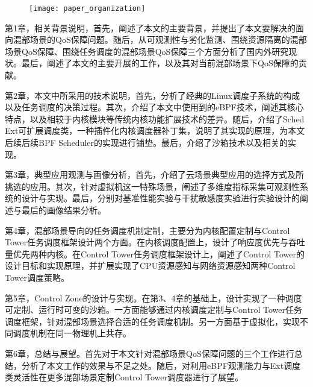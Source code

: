 \begin{figure}[!htbp]
    \centering
    \texttt{[image: paper\_organization]}
    \label{fig:paper_organization}
\end{figure}

第1章，相关背景说明，首先，阐述了本文的主要背景，并提出了本文要解决的面向混部场景的QoS保障问题。随后，从可观测性与劣化监测、围绕资源隔离的混部场景QoS保障、围绕任务调度的混部场景QoS保障三个方面分析了国内外研究现状。最后，阐述了本文的主要开展的工作，以及其对当前混部场景下QoS保障的贡献。

第2章，本文中所采用的技术说明，首先，分析了经典的Linux调度子系统的构成以及任务调度的决策过程。其次，介绍了本文中使用到的eBPF技术，阐述其核心特点，以及相较于内核模块等传统内核功能扩展技术的差异。随后，介绍了Sched Ext可扩展调度类，一种插件化内核调度器补丁集，说明了其实现的原理，为本文后续后续BPF Scheduler的实现进行铺垫。最后，介绍了沙箱技术以及相关的实现。

第3章，典型应用观测与画像分析，首先，介绍了云场景典型应用的选择方式及所挑选的应用。其次，针对虚拟机这一特殊场景，阐述了多维度指标采集可观测性系统的设计与实现。最后，分别对基准性能实验与干扰敏感度实验进行实验设计的阐述与最后的画像结果分析。

第4章，混部场景导向的任务调度机制定制，主要分为内核配置定制与Control Tower任务调度框架设计两个方面。在内核调度配置上，设计了响应度优先与吞吐量优先两种内核。在Control Tower任务调度框架设计上，阐述了Control Tower的设计目标和实现原理，并扩展实现了CPU资源感知与网络资源感知两种Control Tower调度策略。

第5章，Control Zone的设计与实现。在第3、4章的基础上，设计实现了一种调度可定制、运行时可变的沙箱。一方面能够通过内核调度定制与Control Tower任务调度框架，针对混部场景选择合适的任务调度机制。另一方面基于虚拟化，实现不同调度机制在同一物理机上共存。

第6章，总结与展望。首先对于本文针对混部场景QoS保障问题的三个工作进行总结，分析了本文工作的效果与不足之处。随后，对利用eBPF观测能力与Ext调度类灵活性在更多混部场景定制Control Tower调度器进行了展望。